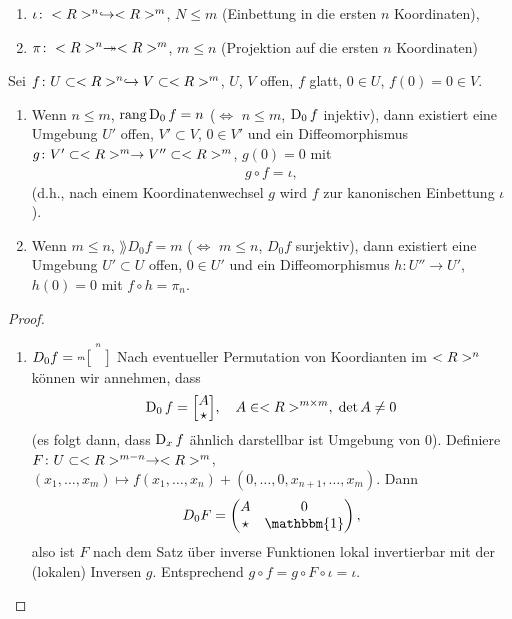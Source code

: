 \begin{example}
\begin{enumerate}[label={für (\arabic*)},wide=0pt,leftmargin=*]
	\item $\iota\colon <R>^n\hookrightarrow <R>^m$, $N\le m$ (Einbettung in die ersten $n$ Koordinaten),
	\item $\pi\colon <R>^n\twoheadrightarrow <R>^m$, $m\le n$ (Projektion auf die ersten $n$ Koordinaten)
\end{enumerate}
\end{example}

\begin{proposition}
	Sei $f\colon U\subset <R>^n\hookrightarrow V\subset <R>^m$, $U$, $V$ offen, $f$ glatt, $0\in U$, $f(0)=0\in V$.\begin{enumerate}[label={(\arabic*)}]
		\item Wenn $n\le m$, $\operatorname{rang} \operatorname{D}_0 f = n$ ($\Leftrightarrow$ $n\le m$, $\operatorname{D}_0 f$ injektiv), dann existiert eine Umgebung $U'$ offen, $V'\subset V$, $0\in V'$ und ein Diffeomorphismus $g\colon V'\subset<R>^m\to V''\subset <R>^m$, $g(0)=0$ mit \begin{align*}
			g\circ f = \iota,
		\end{align*}
		(d.h., nach einem Koordinatenwechsel $g$ wird $f$ zur kanonischen Einbettung $\iota$).
		\item Wenn $m\le n$, $\rang D_0 f = m$ ($\Leftrightarrow$ $m\le n$, $D_0 f$ surjektiv), dann existiert eine Umgebung $U'\subset U$ offen, $0\in U'$ und ein Diffeomorphismus $h\colon U''\to U'$, $h(0)=0$ mit $f\circ h = \pi_n$.
	\end{enumerate}
\end{proposition}

\begin{proof}
	\leavevmode\begin{enumerate}[label={zu (\arabic*)},wide=0pt,leftmargin=*]
		\item $D_0 f = \raisebox{0.3ex}{$\scriptscriptstyle m$}\overset{\scriptscriptstyle n}{\big[\quad\big]}$ Nach eventueller Permutation von Koordianten im $<R>^n$ können wir annehmen, dass\begin{align*}
			\D_0 f = \Big[ \substack{\displaystyle A\\ \rule{0pt}{1em}\raisebox{0.3ex}{$\star$}}\Big],\quad A\in\R^{m\times m},\;\det A\neq 0
		\end{align*}
		(es folgt dann, dass $\operatorname{D}_x f$ ähnlich darstellbar ist Umgebung von $0$). Definiere $F\colon U\subset<R>^{m-n}\to <R>^m$, $(x_1,\dots,x_m)\mapsto f(x_1,\dots,x_n) + (0,\dots,0,x_{n+1},\dots,x_m)$. Dann\begin{align*}
			D_0 F = \begin{pmatrix}
				A & 0 \\ \star & \mathbbm{1}
			\end{pmatrix},
		\end{align*}
		also ist $F$ nach dem Satz über inverse Funktionen lokal invertierbar mit der (lokalen) Inversen $g$. Entsprechend $g\circ f = g\circ F\circ \iota = \iota$.
	\end{enumerate}
\end{proof}